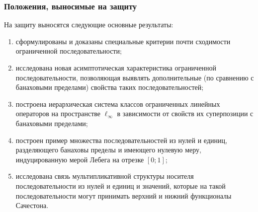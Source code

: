 \begin{frame}\frametitle{Положения, выносимые на защиту}
	На защиту выносятся следующие основные результаты:
	\begin{enumerate}
		\item
			сформулированы и доказаны специальные критерии почти сходимости
			ограниченной последовательности;
		\item
			исследована новая асимптотическая характеристика ограниченной последовательности,
			позволяющая выявлять дополнительные (по сравнению с банаховыми пределами)
			свойства таких последовательностей;
		\item
			построена иерархическая система классов ограниченных линейных операторов
			на пространстве $\ell_\infty$ в зависимости от свойств их суперпозиции с банаховыми пределами;
		\item
			построен пример множества последовательностей из нулей и единиц, разделяющего банаховы пределы
			и имеющего нулевую меру, индуцированную мерой Лебега на отрезке $[0;1]$;
		\item
			исследована связь мультипликативной структуры носителя последовательности из нулей и единиц
			и значений, которые на такой последовательности могут принимать верхний и нижний функционалы Сачестона.
	\end{enumerate}
\end{frame}
